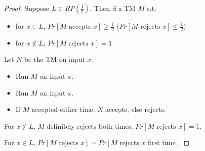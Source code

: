 \begin{proof}
    Suppose $L \in RP(\frac{1}{2})$. Then $\exists$ a \textsf{TM} $M$ s.t.

    \begin{itemize}
        \item for $x \in L$, $Pr[M \text{ accepts } x] \geq \frac{1}{2}$ ($Pr[M \text{ rejects } x] \leq \frac{1}{2}$)
        \item for $x \notin L$, $Pr[M \text{ rejects } x] = 1$
    \end{itemize}

    Let $N$ be the \textsf{TM} on input $x$:

    \begin{itemize}
        \item Run $M$ on input $x$.
        \item Run $M$ on input $x$.
        \item If $M$ accepted either time, $N$ accepts, else rejects.
    \end{itemize}

    For $x \notin L$, $M$ definitely rejects both times, $Pr[M \text{ rejects } x] = 1$.

    For $x \in L$, $Pr[M \text{ rejects } x] = Pr[M \text{ rejects } x \text{ first time}]$
\end{proof}
